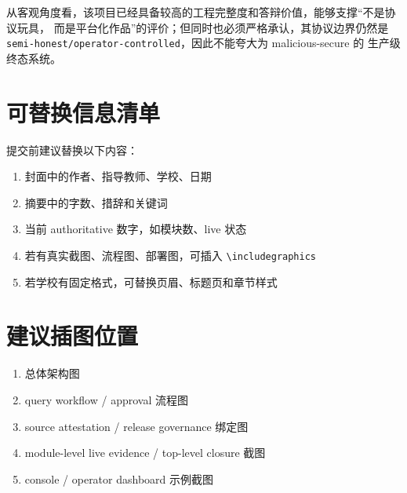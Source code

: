 \documentclass[UTF8,a4paper,12pt,oneside]{ctexrep}
\begin{document}
从客观角度看，该项目已经具备较高的工程完整度和答辩价值，能够支撑“不是协议玩具，
而是平台化作品”的评价；但同时也必须严格承认，其协议边界仍然是
\texttt{semi-honest/operator-controlled}，因此不能夸大为 malicious-secure 的
生产级终态系统。

\appendix

\chapter{可替换信息清单}

提交前建议替换以下内容：

\begin{enumerate}
  \item 封面中的作者、指导教师、学校、日期
  \item 摘要中的字数、措辞和关键词
  \item 当前 authoritative 数字，如模块数、live 状态
  \item 若有真实截图、流程图、部署图，可插入 \verb|\includegraphics|
  \item 若学校有固定格式，可替换页眉、标题页和章节样式
\end{enumerate}

\chapter{建议插图位置}

\begin{enumerate}
  \item 总体架构图
  \item query workflow / approval 流程图
  \item source attestation / release governance 绑定图
  \item module-level live evidence / top-level closure 截图
  \item console / operator dashboard 示例截图
\end{enumerate}
\end{document}
